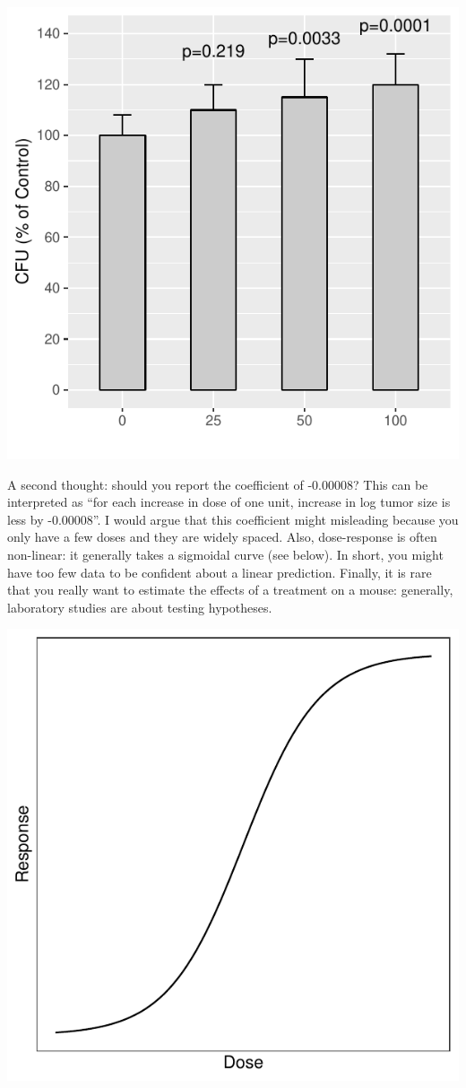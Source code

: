 \documentclass[]{book}
\begin{document}
\includegraphics{09-answers_files/figure-latex/week5u-1.pdf}

A second thought: should you report the coefficient of -0.00008? This can be interpreted as ``for each increase in dose of one unit, increase in log tumor size is less by -0.00008''. I would argue that this coefficient might misleading because you only have a few doses and they are widely spaced. Also, dose-response is often non-linear: it generally takes a sigmoidal curve (see below). In short, you might have too few data to be confident about a linear prediction. Finally, it is rare that you really want to estimate the effects of a treatment on a mouse: generally, laboratory studies are about testing hypotheses.

\includegraphics{09-answers_files/figure-latex/week5v-1.pdf}
\end{document}

